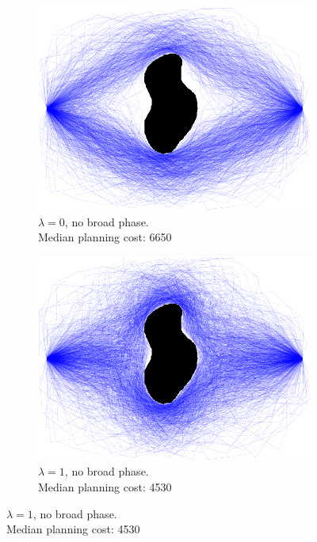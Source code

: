\documentclass{report}
\begin{document}
\begin{figure}
\centering

\begin{subfigure}[t]{0.45\linewidth}
\centering
\includegraphics[width=\columnwidth]{figs/paths-lambda0-norel.png}
\caption{
  $\lambda=0$, no broad phase.\\
  Median planning cost: 6650}
\end{subfigure}
\begin{subfigure}[t]{0.45\linewidth}
\centering
\includegraphics[width=\columnwidth]{figs/paths-lambda1-norel.png}
\caption{
  $\lambda=1$, no broad phase.\\
  Median planning cost: 4530}
\end{subfigure}


\end{figure}
\end{document}
